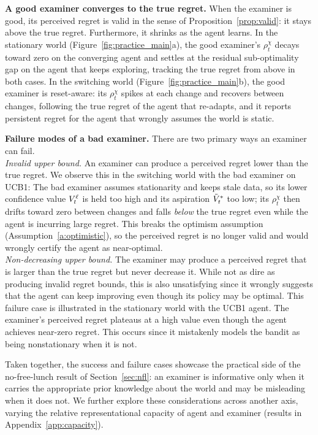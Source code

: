 \textbf{A good examiner converges to the true regret.} 
When the examiner is good, its perceived regret is valid  in the sense of Proposition~\ref{prop:valid}: it stays above the true regret. Furthermore, it shrinks as the agent learns. 
In the stationary world (Figure~\ref{fig:practice_main}a), the good examiner's $\rho^\chi_t$ decays toward zero on the converging agent and settles at the residual sub-optimality gap on the agent that keeps exploring, tracking the true regret from above in both cases. 
In the switching world (Figure~\ref{fig:practice_main}b), the good examiner is reset-aware: its $\rho^\chi_t$ spikes at each change and recovers between changes, following the true regret of the agent that re-adapts, and it reports persistent regret for the agent that wrongly assumes the world is static.

\textbf{Failure modes of a bad examiner.} 
There are two primary ways an examiner can fail.\\
\textit{Invalid upper bound.} 
An examiner can produce a perceived regret lower than the true regret. 
We observe this in the switching world with the bad examiner on UCB1: 
The bad examiner assumes stationarity and keeps stale data, so its lower confidence value $V^{\ell}_t$ is held too high and its aspiration $\tilde{V}^*_t$ too low; its $\rho^\chi_t$ then drifts toward zero between changes and falls \emph{below} the true regret even while the agent is incurring large regret. 
This breaks the optimism assumption (Assumption~\ref{a:optimistic}), so the perceived regret is no longer valid and would wrongly certify the agent as near-optimal.\\
\textit{Non-decreasing upper bound.} The examiner may produce a perceived regret that is larger than the true regret but never decrease it. 
While not as dire as producing invalid regret bounds, this is also unsatisfying since it wrongly suggests that the agent can keep improving even though its policy may be optimal. 
This failure case is illustrated in the stationary world with the UCB1 agent. The examiner's perceived regret plateaus at a high value even though the agent achieves near-zero regret. This occurs since it mistakenly models the bandit as being nonstationary when it is not.

Taken together, the success and failure cases showcase the practical side of the no-free-lunch result of Section~\ref{sec:nfl}: an examiner is informative only when it carries the appropriate prior knowledge about the world and may be misleading when it does not. 
We further explore these considerations across another axis, varying the relative representational capacity of agent and examiner (results in Appendix~\ref{app:capacity}).

